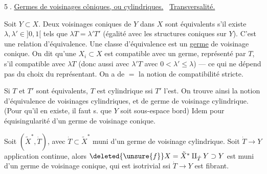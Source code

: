\textcircled{5.}
\uline{Germes de voisinages côniques, ou cylindriques.}
\ \uline{Transversalité.}

Soit $Y\subset X$. Deux voisinages coniques
 de $Y$ dans
$X$ sont équivalents s'il existe $\lambda,\lambda'\in]0,1[$ tels
que $\lambda T=\lambda'T'$ (égalité 
avec les structures
coniques sur $Y$). C'est une relation d'équivalence.
\margin{donc pour $\varepsilon\in]0,1[$,
$\varepsilon\lambda T=\varepsilon\lambda'T'$}
Une classe d'équivalence est un \uline{germe} de
voisinage conique. On dit qu'une $X_i\subset X$
est compatible avec un germe, représenté par $T$,
s'il \inserted{$\exists\lambda\in]0,1[$ \deleted{\unsure{telle}}
tel qu'il soit} compatible avec $\lambda T$
(donc aussi avec $\lambda'T$
avec $0<\lambda'\leq\lambda$) --- ce qui ne dépend pas du
choix du représentant. On a de $=$ la
notion de compatibilité stricte.

Si $T$ et $T'$ sont équivalents, 
$T$ est
cylindrique ssi $T'$ l'est. On trouve ainsi la notion
d'équivalence de voisinages cylindriques, et  de
germe de voisinage cylindrique. (Pour qu'il
en existe, il faut s. que $Y$ soit sous-espace bord)
Idem pour équisingularité d'un germe de
voisinage conique.

Soit $(\tilde X^*,\dot T)$, avec $\dot T\subset\tilde X^*$ muni d'un
germe de voisinage cylindrique. Soit $\dot T\longrightarrow Y$
application continue, alors
$\deleted{\unsure{f}}X=\tilde X^*\amalg_{\dot T}Y\supset Y$
est muni d'un germe de voisinage  conique,
qui est isotrivial ssi $\dot T\longrightarrow Y$ est fibrant.
